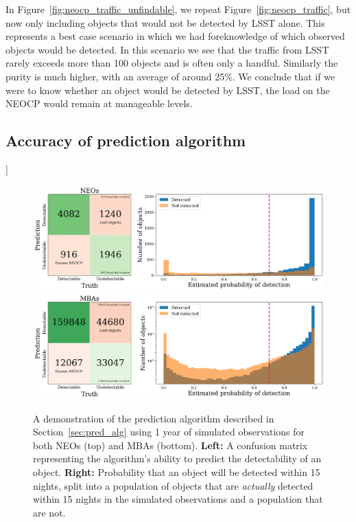 \documentclass[twocolumn]{aastex631}
\newcommand{\todo}[1]{{\color{red}{[TODO: #1}]}}
\begin{document}
In Figure~\ref{fig:neocp_traffic_unfindable}, we repeat Figure~\ref{fig:neocp_traffic}, but now only including objects that would not be detected by LSST alone. This represents a best case scenario in which we had foreknowledge of which observed objects would be detected. In this scenario we see that the traffic from LSST rarely exceeds more than 100 objects and is often only a handful. Similarly the purity is much higher, with an average of around 25\%. We conclude that if we were to know whether an object would be detected by LSST, the load on the NEOCP would remain at manageable levels.

\subsection{Accuracy of prediction algorithm}
\todo{Demonstrate the efficiency of this method with some plots like fig 3}
\begin{figure}[htb]
    \centering
    \includegraphics[width=\textwidth]{contingency_neo.png}
    \includegraphics[width=\textwidth]{contingency_mba.png}
    \caption{A demonstration of the prediction algorithm described in Section~\ref{sec:pred_alg} using 1 year of simulated observations for both NEOs (top) and MBAs (bottom). \textbf{Left:} A confusion matrix representing the algorithm's ability to predict the detectability of an object. \textbf{Right:} Probability that an object will be detected within 15 nights, split into a population of objects that are \textit{actually} detected within 15 nights in the simulated observations and a population that are not.}
\end{figure}
\end{document}
